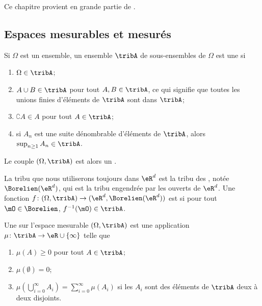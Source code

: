 
Ce chapitre provient en grande partie de \cite{ProbaDanielLi}.

\subsection{Espaces mesurables et mesurés}

\begin{definition}
    Si \( \Omega\) est un ensemble, un ensemble \( \tribA\) de sous-ensembles de \( \Omega\) est une  si
    \begin{enumerate}
        \item
            \( \Omega\in\tribA\);
        \item
            \( A\cup B\in\tribA\) pour tout \( A,B\in\tribA\), ce qui signifie que toutes les unions finies d'éléments de \( \tribA\) sont dans \( \tribA\);
        \item
            \( \complement A\in A\) pour tout \( A\in\tribA\);
        \item
            si \( A_n\) est une suite dénombrable d'éléments de \( \tribA\), alors \( \sup_{n\geq 1}A_n\in\tribA\).
    \end{enumerate}
    Le couple \( (\Omega,\tribA)\) est alors un .
\end{definition}

La tribu que nous utiliserons toujours dans \( \eR^d\) est la tribu des , notée \( \Borelien(\eR^d)\), qui est la tribu engendrée par les ouverts de \( \eR^d\). Une fonction \( f\colon (\Omega,\tribA)\to (\eR^d,\Borelien(\eR^d))\) est  si pour tout \( \mO\in\Borelien\), \( f^{-1}(\mO)\in\tribA\).

\begin{definition}
    Une  sur l'espace mesurable \( (\Omega,\tribA)\) est une application \( \mu\colon \tribA\to \eR\cup\{ \infty \}\) telle que
    \begin{enumerate}
        \item
            \( \mu(A)\geq 0\) pour tout \( A\in\tribA\);
        \item
            \( \mu(\emptyset)=0\);
        \item
            \( \mu\left( \bigcup_{i=0}^{\infty}A_i\right)=\sum_{i=0}^{\infty}\mu(A_i)\) si les \( A_i\) sont des éléments de \( \tribA\) deux à deux disjoints.
    \end{enumerate}
\end{definition}

